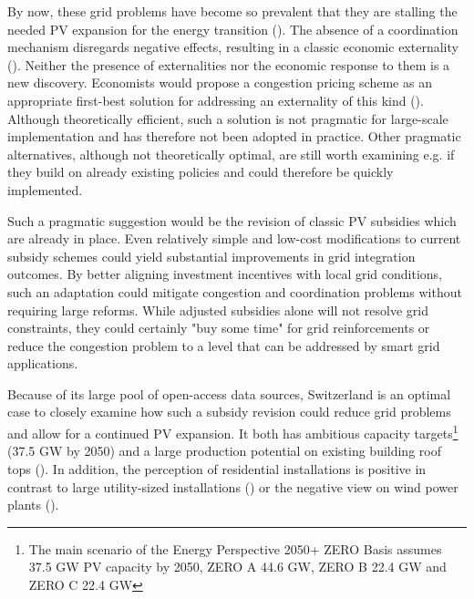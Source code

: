 \documentclass[12PT, ]{article}
\begin{document}
By now, these grid problems have become so prevalent that they are stalling the needed PV expansion for the energy transition (\cite{renewables2023}).
%
The absence of a coordination mechanism disregards negative effects, resulting in a classic economic externality (\cite{babar2019}).
%
Neither the presence of externalities nor the economic response to them is a new discovery. Economists would propose a congestion pricing scheme as an appropriate first-best solution for addressing an externality of this kind (\cite{bai2018}). Although theoretically efficient, such a solution is not pragmatic for large-scale implementation and has therefore not been adopted in practice.
%
Other pragmatic alternatives, although not theoretically optimal, are still worth examining e.g. if they build on already existing policies and could therefore be quickly implemented.

Such a pragmatic suggestion would be the revision of classic PV subsidies which are already in place. 
%
Even relatively simple and low-cost modifications to current subsidy schemes could yield substantial improvements in grid integration outcomes. 
%
By better aligning investment incentives with local grid conditions, such an adaptation could mitigate congestion and coordination problems without requiring large reforms. %
While adjusted subsidies alone will not resolve grid constraints, they could certainly "buy some time" for grid reinforcements or reduce the congestion problem to a level that can be addressed by smart grid applications.

Because of its large pool of open-access data sources, Switzerland is an optimal case to closely examine how such a subsidy revision could reduce grid problems and allow for a continued PV expansion. 
%
It both has ambitious capacity targets\footnote{The main scenario of the Energy Perspective 2050+ ZERO Basis assumes 37.5 GW PV capacity by 2050, ZERO A 44.6 GW, ZERO B 22.4 GW and ZERO C 22.4 GW} (37.5 GW by 2050) and a large production potential on existing building roof tops (\cite{vese_pvpower2021}).
In addition, the perception of residential installations is positive in contrast to large utility-sized installations (\cite{sutterlin2017}) or the negative view on wind power plants (\cite{cousse2020}).
\end{document}
